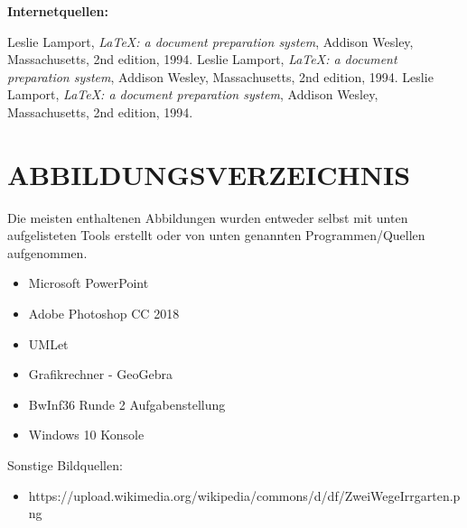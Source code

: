 \documentclass[a4paper,12pt]{article}
\begin{document}
\vspace{1cm}

\begin{large}
\textbf{Internetquellen:}
\end{large}

\begin{thebibliography}{9}

      Leslie Lamport,
      \textit{\LaTeX: a document preparation system},
      Addison Wesley, Massachusetts,
      2nd edition,
      1994.
      Leslie Lamport,
      \textit{\LaTeX: a document preparation system},
      Addison Wesley, Massachusetts,
      2nd edition,
      1994.
      Leslie Lamport,
      \textit{\LaTeX: a document preparation system},
      Addison Wesley, Massachusetts,
      2nd edition,
      1994.

\end{thebibliography}

\endgroup


\newpage
\section{ABBILDUNGSVERZEICHNIS}
Die meisten enthaltenen Abbildungen wurden entweder selbst mit unten aufgelisteten Tools erstellt oder von unten genannten Programmen/Quellen aufgenommen.
\begin{itemize}
\item Microsoft PowerPoint
\item Adobe Photoshop CC 2018
\item UMLet
\item Grafikrechner - GeoGebra
\item BwInf36 Runde 2 Aufgabenstellung
\item Windows 10 Konsole
\end{itemize}

Sonstige Bildquellen:
\begin{itemize}
\item https://upload.wikimedia.org/wikipedia/commons/d/df/ZweiWegeIrrgarten.png
\end{itemize}
\end{document}
